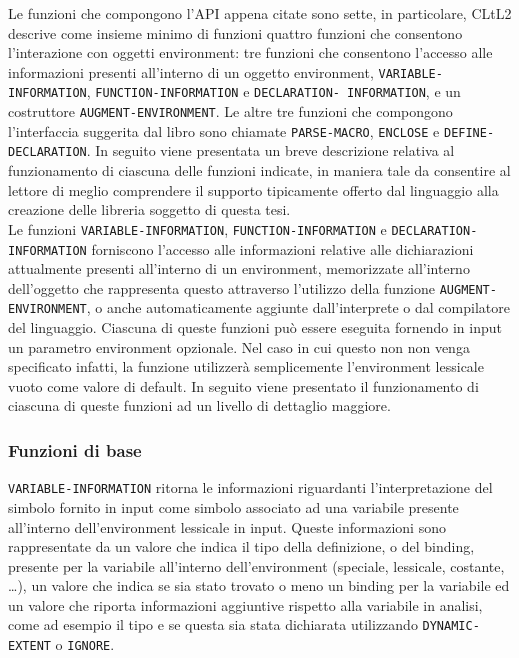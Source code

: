 Le funzioni che compongono l’API appena citate sono sette, in particolare,
CLtL2 descrive come insieme minimo di funzioni quattro funzioni che consentono
l’interazione con oggetti environment: tre funzioni che consentono l’accesso
alle informazioni presenti all’interno di un oggetto environment, \texttt
{VARIABLE-INFORMATION}, \texttt{FUNCTION-INFORMATION} e \texttt{DECLARATION-
INFORMATION}, e un costruttore \texttt{AUGMENT-ENVIRONMENT}. Le altre tre
funzioni che compongono l’interfaccia suggerita dal libro sono chiamate \texttt
{PARSE-MACRO}, \texttt{ENCLOSE} e \texttt{DEFINE-DECLARATION}. In seguito viene
presentata un breve descrizione relativa al funzionamento di ciascuna delle
funzioni indicate, in maniera tale da consentire al lettore di meglio
comprendere il supporto tipicamente offerto dal linguaggio alla creazione delle
libreria soggetto di questa tesi.\\

Le funzioni \texttt{VARIABLE-INFORMATION}, \texttt{FUNCTION-INFORMATION} e
\texttt{DECLARATION-INFORMATION} forniscono l’accesso alle informazioni
relative alle dichiarazioni attualmente presenti all’interno di un environment,
memorizzate all’interno dell’oggetto che rappresenta questo attraverso
l’utilizzo della funzione \texttt{AUGMENT-ENVIRONMENT}, o anche automaticamente
aggiunte dall’interprete o dal compilatore del linguaggio. Ciascuna di queste
funzioni può essere eseguita fornendo in input un parametro environment
opzionale. Nel caso in cui questo non non venga specificato infatti, la
funzione utilizzerà semplicemente l’environment lessicale vuoto come valore di
default. In seguito viene presentato il funzionamento di ciascuna di queste
funzioni ad un livello di dettaglio maggiore.

\subsubsection{Funzioni di base}

\texttt{VARIABLE-INFORMATION} ritorna le informazioni riguardanti
l’interpretazione del simbolo fornito in input come simbolo associato ad una variabile presente all’interno
dell'environment lessicale in input. Queste informazioni sono rappresentate da
un valore che indica il tipo della definizione, o del binding, presente per la
variabile all’interno dell’environment (speciale, lessicale, costante, \dots),
un valore che indica se sia stato trovato o meno un binding per la variabile ed
un valore che riporta informazioni aggiuntive rispetto alla variabile in
analisi, come ad esempio il tipo e se questa sia stata dichiarata utilizzando
\texttt {DYNAMIC-EXTENT} o \texttt{IGNORE}.

